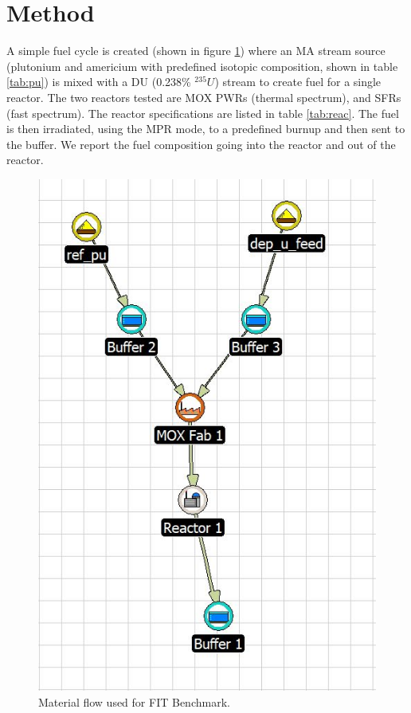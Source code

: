 \documentclass{article}
\begin{document}
\section{Method}

A simple fuel cycle is created (shown in figure \ref{fig:flow}) where an \gls{MA} stream source
(plutonium and americium with predefined isotopic composition, shown in table \ref{tab:pu}) is mixed with a \gls{DU} (0.238\% $^{235}U$)
stream to create fuel for a single reactor. The two reactors tested are \gls{MOX} \glspl{PWR} (thermal spectrum), and \glspl{SFR} (fast spectrum). The reactor specifications
are listed in table \ref{tab:reac}. The fuel is then irradiated, using the MPR mode, to a predefined burnup and then sent to the buffer. We report the fuel composition going into the
reactor and out of the reactor. 

\begin{figure}[htbp!]
    \begin{center}
        \includegraphics[scale=0.5]{./flow.jpg}
    \end{center}
    \caption{Material flow used for \gls{FIT} Benchmark.}
    \label{fig:flow}
\end{figure}
\end{document}
